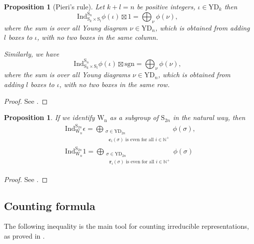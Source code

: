 \documentclass[12pt, a4paper]{amsart}
\numberwithin{equation}{section}
\newtheorem{prop}[thm]{Proposition}
\newcommand{\br}{{\mathbf{r}}}
\newcommand{\bc}{{\mathbf{c}}}
\newcommand{\BN}{{\mathbb {N}}}
\newcommand{\Ind}{{\mathrm{Ind}}}
\newcommand{\sgn}{{\mathrm{sgn}}}
\begin{document}
\begin{prop}[Pieri's rule]\label{Pieri}
    Let $k + l = n$ be positive integers, $\iota \in \mathrm{YD}_{k}$ then
    \begin{equation}
        \Ind_{\mathrm{S}_k \times \mathrm{S}_l}^{\mathrm{S}_{n}}\phi(\iota) \boxtimes 1 = \bigoplus_{\nu} \phi(\nu),
    \end{equation}
    where the sum is over all Young diagram $\nu \in \mathrm{YD}_n$, which is obtained from adding $l$ boxes to $\iota$, with no two boxes in the same column.
    
    Similarly, we have
    \begin{equation}
        \Ind_{\mathrm{S}_{k} \times \mathrm{S}_{l}}^{\mathrm{S}_n}\phi(\iota) \boxtimes \sgn = \bigoplus_{\nu}\phi(\nu),
    \end{equation}
    where the sum is over all Young diagrams $\nu \in \mathrm{YD}_n$, which is obtained from adding $l$ boxes to $\iota$, with no two boxes in the same row.
\end{prop}

\begin{proof}
    See \cite[Corollary 6.1.7]{GP}.
\end{proof}

\begin{prop}\label{branch}
    If we identify $\mathrm{W_n}$ as a subgroup of $\mathrm{S}_{2n}$ in the natural way, then
    \begin{align}
        &\Ind_{\mathrm{W}_n}^{\mathrm{S}_{2n}} \epsilon = \bigoplus_{\substack{\sigma \in \mathrm{YD}_{2n}\\ \textrm{ $\bc_{i}(\sigma)$ is even for all $i \in \BN^+$}}} \phi(\sigma),\\
        &\Ind_{\mathrm{W}_n}^{\mathrm{S}_{2n}} 1 = \bigoplus_{\substack{\sigma \in \mathrm{YD}_{2n}\\ \textrm{ $\br_{i}(\sigma)$ is even for all $i \in \BN^+$}}} \phi(\sigma)
    \end{align}
\end{prop}

\begin{proof}
    See \cite[Lemma 4.1 (b)]{BV83}.
\end{proof}

\subsection{Counting formula}

The following inequality is the main tool for counting irreducible representations, as proved in \cite{BMSZ}. 
\end{document}
